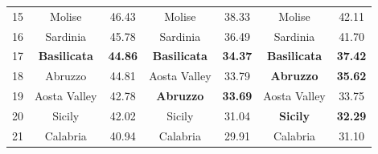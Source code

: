 \begin{table}[h!]
\begin{tabularx}{\textwidth}{c|Cc|Cc|Cc}
15 & Molise & 46.43 & Molise & 38.33 & Molise & 42.11 \\
16 & Sardinia & 45.78 & Sardinia & 36.49 & Sardinia & 41.70 \\
17 & \textbf{Basilicata} & \textbf{44.86} & \textbf{Basilicata} & \textbf{34.37} & \textbf{Basilicata} & \textbf{37.42} \\
18 & Abruzzo & 44.81 & Aosta Valley & 33.79 & \textbf{Abruzzo} & \textbf{35.62} \\
19 & Aosta Valley & 42.78 & \textbf{Abruzzo} & \textbf{33.69} & Aosta Valley & 33.75 \\
20 & Sicily & 42.02 & Sicily & 31.04 & \textbf{Sicily} & \textbf{32.29} \\
21 & Calabria & 40.94 & Calabria & 29.91 & Calabria & 31.10 \\
\bottomrule
\end{tabularx}
\end{table}
